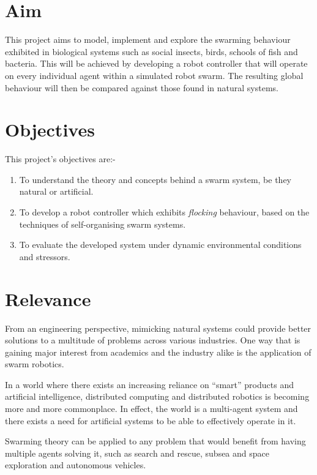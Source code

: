 \section{Aim}
This project aims to model, implement and explore the swarming behaviour exhibited in biological systems such as social insects, birds, schools of fish and bacteria. This will be achieved by developing a robot controller that will operate on every individual agent within a simulated robot swarm. The resulting global behaviour will then be compared against those found in natural systems.


\section{Objectives}
 This project's objectives are:-

\begin{enumerate}
	\item To understand the theory and concepts behind a swarm system, be they natural or artificial.
	\item To develop a robot controller which exhibits \textit{flocking} behaviour, based on the techniques of self-organising swarm systems.
	\item To evaluate the developed system under dynamic environmental conditions and stressors.
\end{enumerate}

\section{Relevance}

From an engineering perspective, mimicking natural systems could provide better solutions to a multitude of problems across various industries. One way that is gaining major interest from academics and the industry alike is the application of swarm robotics.

In a world where there exists an increasing reliance on ``smart'' products and artificial intelligence, distributed computing and distributed robotics is becoming more and more commonplace. In effect, the world is a multi-agent system and there exists a need for artificial systems to be able to effectively operate in it.

Swarming theory can be applied to any problem that would benefit from having multiple agents solving it, such as search and rescue, subsea and space exploration and autonomous vehicles. 


